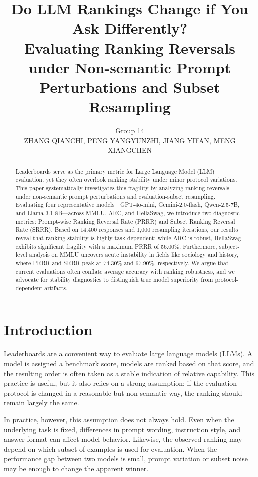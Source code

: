 \documentclass[11pt]{article}
\title{\textbf{Do LLM Rankings Change if You Ask Differently?}\\
\large Evaluating Ranking Reversals under Non-semantic Prompt Perturbations and Subset Resampling}
\author{Group 14\\
ZHANG QIANCHI, PENG YANGYUNZHI, JIANG YIFAN, MENG XIANGCHEN}
\date{}
\theoremstyle{definition}
\begin{document}
\maketitle
\vspace{-1em}

\begin{abstract}
Leaderboards serve as the primary metric for Large Language Model (LLM) evaluation, yet they often overlook ranking stability under minor protocol variations. This paper systematically investigates this fragility by analyzing ranking reversals under non-semantic prompt perturbations and evaluation-subset resampling. Evaluating four representative models---GPT-4o-mini, Gemini-2.0-flash, Qwen-2.5-7B, and Llama-3.1-8B---across MMLU, ARC, and HellaSwag, we introduce two diagnostic metrics: Prompt-wise Ranking Reversal Rate (PRRR) and Subset Ranking Reversal Rate (SRRR). Based on 14,400 responses and 1,000 resampling iterations, our results reveal that ranking stability is highly task-dependent: while ARC is robust, HellaSwag exhibits significant fragility with a maximum PRRR of 56.00\%. Furthermore, subject-level analysis on MMLU uncovers acute instability in fields like sociology and history, where PRRR and SRRR peak at 74.30\% and 67.90\%, respectively. We argue that current evaluations often conflate average accuracy with ranking robustness, and we advocate for stability diagnostics to distinguish true model superiority from protocol-dependent artifacts.
\end{abstract}

\section{Introduction}

Leaderboards are a convenient way to evaluate large language models (LLMs). A model is assigned a benchmark score, models are ranked based on that score, and the resulting order is often taken as a stable indication of relative capability. This practice is useful, but it also relies on a strong assumption: if the evaluation protocol is changed in a reasonable but non-semantic way, the ranking should remain largely the same.

In practice, however, this assumption does not always hold. Even when the underlying task is fixed, differences in prompt wording, instruction style, and answer format can affect model behavior. Likewise, the observed ranking may depend on which subset of examples is used for evaluation. When the performance gap between two models is small, prompt variation or subset noise may be enough to change the apparent winner.
\end{document}
